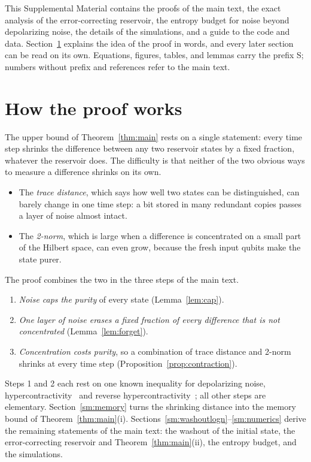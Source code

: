 \documentclass[aps,prl,twocolumn,superscriptaddress,floatfix]{revtex4-2}
\theoremstyle{plain}
\begin{document}
This Supplemental Material contains the proofs of the main text, the exact analysis of the error-correcting reservoir, the entropy budget for noise beyond depolarizing noise, the details of the simulations, and a guide to the code and data. Section~\ref{sm:overview} explains the idea of the proof in words, and every later section can be read on its own. Equations, figures, tables, and lemmas carry the prefix S; numbers without prefix and references refer to the main text.

\let\addcontentsline\SMaddcontentsline
\tableofcontents
\vspace{8pt}

\section{How the proof works}
\label{sm:overview}

The upper bound of Theorem~\ref{thm:main} rests on a single statement: every time step shrinks the difference between any two reservoir states by a fixed fraction, whatever the reservoir does. The difficulty is that neither of the two obvious ways to measure a difference shrinks on its own.
\begin{itemize}
\item The \emph{trace distance}, which says how well two states can be distinguished, can barely change in one time step: a bit stored in many redundant copies passes a layer of noise almost intact.
\item The \emph{2-norm}, which is large when a difference is concentrated on a small part of the Hilbert space, can even grow, because the fresh input qubits make the state purer.
\end{itemize}
The proof combines the two in the three steps of the main text.
\begin{enumerate}
\item \emph{Noise caps the purity} of every state (Lemma~\ref{lem:cap}).
\item \emph{One layer of noise erases a fixed fraction of every difference that is not concentrated} (Lemma~\ref{lem:forget}).
\item \emph{Concentration costs purity}, so a combination of trace distance and 2-norm shrinks at every time step (Proposition~\ref{prop:contraction}).
\end{enumerate}
Steps 1 and 2 each rest on one known inequality for depolarizing noise, hypercontractivity~\cite{King2014} and reverse hypercontractivity~\cite{Cubitt2015}; all other steps are elementary. Section~\ref{sm:memory} turns the shrinking distance into the memory bound of Theorem~\ref{thm:main}(i). Sections~\ref{sm:washoutlogn}--\ref{sm:numerics} derive the remaining statements of the main text: the washout of the initial state, the error-correcting reservoir and Theorem~\ref{thm:main}(ii), the entropy budget, and the simulations.
\end{document}
